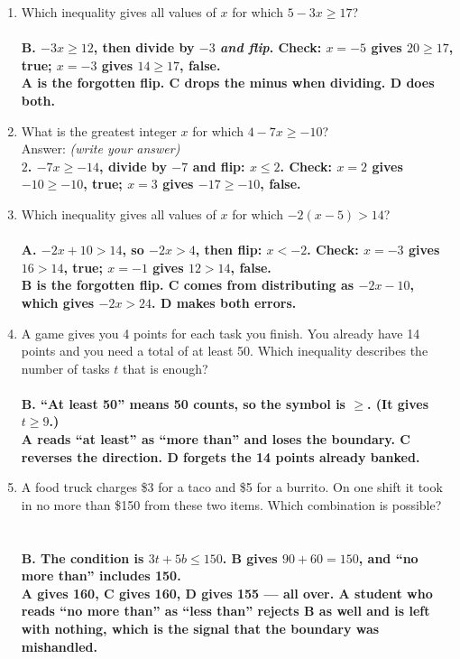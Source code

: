 \documentclass[11pt,a4paper]{article}
\newcommand{\spr}{\\[3pt]\hspace*{6pt}Answer: \underline{\hspace{3.2cm}}\hfill{\footnotesize\itshape(write your answer)}}
\newcommand{\ans}[1]{\ {\color{keyred}\bfseries #1}}
\newcommand{\ans}[1]{}
\begin{document}
\begin{enumerate}[leftmargin=20pt,itemsep=9pt]
\item Which inequality gives all values of $x$ for which $5-3x\ge17$?\\
  \ans{\\ B. $-3x\ge12$, then divide by $-3$ \emph{and flip}. Check: $x=-5$ gives $20\ge17$, true; $x=-3$ gives $14\ge17$, false. \\ A is the forgotten flip. C drops the minus when dividing. D does both.}

\item What is the greatest integer $x$ for which $4-7x\ge-10$? \spr
  \ans{\\ $2$. $-7x\ge-14$, divide by $-7$ and flip: $x\le2$. Check: $x=2$ gives $-10\ge-10$, true; $x=3$ gives $-17\ge-10$, false.}

\item Which inequality gives all values of $x$ for which $-2(x-5)>14$?\\
  \ans{\\ A. $-2x+10>14$, so $-2x>4$, then flip: $x<-2$. Check: $x=-3$ gives $16>14$, true; $x=-1$ gives $12>14$, false. \\ B is the forgotten flip. C comes from distributing as $-2x-10$, which gives $-2x>24$. D makes both errors.}

\item A game gives you 4 points for each task you finish. You already have 14 points and you need a total of at least 50. Which inequality describes the number of tasks $t$ that is enough?\\
  \ans{\\ B. ``At least 50'' means 50 counts, so the symbol is $\ge$. (It gives $t\ge9$.) \\ A reads ``at least'' as ``more than'' and loses the boundary. C reverses the direction. D forgets the 14 points already banked.}

\item A food truck charges \$3 for a taco and \$5 for a burrito. On one shift it took in no more than \$150 from these two items. Which combination is possible?\\
  \\[2pt]
  \ans{\\ B. The condition is $3t+5b\le150$. B gives $90+60=150$, and ``no more than'' includes 150. \\ A gives 160, C gives 160, D gives 155 --- all over. A student who reads ``no more than'' as ``less than'' rejects B as well and is left with nothing, which is the signal that the boundary was mishandled.}


\end{enumerate}
\end{document}
